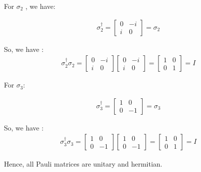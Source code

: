 For $\sigma_2$ , we have:

\begin{align}
  \label{eq:2.19.2}
  \sigma_2^{\dagger} = 
  \begin{bmatrix}
    0 & -i \\
    i & 0
  \end{bmatrix} = \sigma_2
\end{align} 


So, we have :
\begin{align}
    \sigma_2^{\dagger} \sigma_2 = 
    \begin{bmatrix}
        0 & -i \\
        i & 0
    \end{bmatrix}
    \begin{bmatrix}
        0 & -i \\
        i & 0
    \end{bmatrix}
    =
    \begin{bmatrix}
        1 & 0 \\
        0 & 1
    \end{bmatrix} = I
\end{align}

For $\sigma_3$:

\begin{align}
  \label{eq:2.19.3}
  \sigma_3^{\dagger} = 
  \begin{bmatrix}
    1 & 0 \\
    0 & -1
  \end{bmatrix} = \sigma_3
\end{align} 


So, we have :
\begin{align}
    \sigma_3^{\dagger} \sigma_3 = 
    \begin{bmatrix}
        1 & 0 \\
        0 & -1
    \end{bmatrix}
    \begin{bmatrix}
        1 & 0 \\
        0 & -1
    \end{bmatrix}
    =
    \begin{bmatrix}
        1 & 0 \\
        0 & 1
    \end{bmatrix} = I
\end{align}


Hence, all Pauli matrices are unitary and hermitian.










